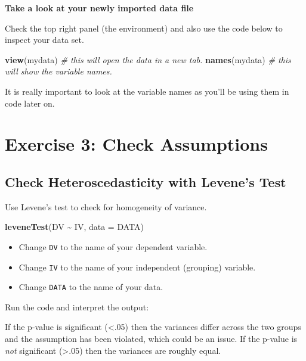 \documentclass[
]{book}
\newenvironment{Shaded}{\begin{snugshade}}{\end{snugshade}}
\newcommand{\AttributeTok}[1]{\textcolor[rgb]{0.13,0.29,0.53}{#1}}
\newcommand{\CommentTok}[1]{\textcolor[rgb]{0.56,0.35,0.01}{\textit{#1}}}
\newcommand{\FunctionTok}[1]{\textcolor[rgb]{0.13,0.29,0.53}{\textbf{#1}}}
\newcommand{\NormalTok}[1]{#1}
\newcommand{\SpecialCharTok}[1]{\textcolor[rgb]{0.81,0.36,0.00}{\textbf{#1}}}
\providecommand{\tightlist}{%
  \setlength{\itemsep}{0pt}\setlength{\parskip}{0pt}}
\let\oldsection\section
\renewcommand{\section}{\needspace{5\baselineskip}\oldsection}
\let\oldsubsection\subsection
\renewcommand{\subsection}{\needspace{3\baselineskip}\oldsubsection}  %
\begin{document}
\textbf{Take a look at your newly imported data file}

Check the top right panel (the environment) and also use the code below to inspect your data set.

\begin{Shaded}
\begin{Highlighting}[]
\FunctionTok{view}\NormalTok{(mydata) }\CommentTok{\# this will open the data in a new tab.}
\FunctionTok{names}\NormalTok{(mydata) }\CommentTok{\# this will show the variable names.}
\end{Highlighting}
\end{Shaded}

It is really important to look at the variable names as you'll be using them in code later on.

\section{Exercise 3: Check Assumptions}\label{exercise-3-check-assumptions}

\subsection{Check Heteroscedasticity with Levene's Test}\label{check-heteroscedasticity-with-levenes-test}

Use Levene's test to check for homogeneity of variance.

\begin{Shaded}
\begin{Highlighting}[]
\FunctionTok{leveneTest}\NormalTok{(DV }\SpecialCharTok{\textasciitilde{}}\NormalTok{ IV, }\AttributeTok{data =}\NormalTok{ DATA)}
\end{Highlighting}
\end{Shaded}

\begin{itemize}
\tightlist
\item
  Change \texttt{DV} to the name of your dependent variable.
\item
  Change \texttt{IV} to the name of your independent (grouping) variable.
\item
  Change \texttt{DATA} to the name of your data.
\end{itemize}

Run the code and interpret the output:

If the p-value is significant (\textless.05) then the variances differ across the two groups and the assumption has been violated, which could be an issue. If the p-value is \emph{not} significant (\textgreater.05) then the variances are roughly equal.
\end{document}
